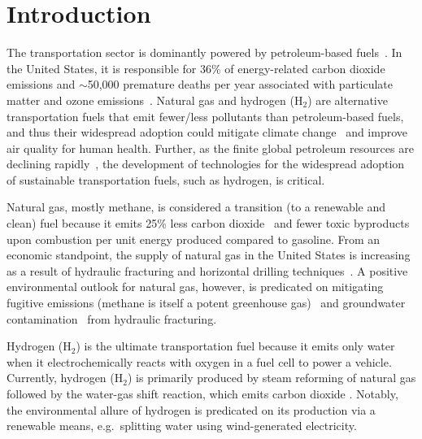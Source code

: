 \section{Introduction}
The transportation sector is dominantly powered by petroleum-based
fuels~\cite{davis2009transportation}. In the United States, it is responsible
for 36\% of energy-related carbon dioxide emissions \cite{useia} and $\sim$50,000
premature deaths per year associated with particulate matter and ozone
emissions~\cite{caiazzo2013air}. Natural gas and hydrogen (H$_2$) are
alternative transportation fuels that emit fewer/less pollutants than
petroleum-based fuels, and thus their widespread adoption could mitigate
climate change~\cite{mcglade2015geographical} and improve air quality for human
health. Further, as the finite global petroleum resources are declining
rapidly~\cite{sorrell2010global}, the development of technologies for the
widespread adoption of sustainable transportation fuels, such as hydrogen, is
critical.

Natural gas, mostly methane, is considered a transition (to a renewable and
clean) fuel because it emits 25\% less carbon dioxide~\cite{eia2013much} and
fewer toxic byproducts~\cite{wang2000full} upon combustion per unit energy
produced compared to gasoline. From an economic standpoint, the supply of
natural gas in the United States is increasing as a result of hydraulic
fracturing and horizontal drilling techniques~\cite{usnatgassupply}. A positive
environmental outlook for natural gas, however, is predicated on mitigating
fugitive emissions (methane is itself a potent greenhouse
gas)~\cite{alvarez2012greater} and groundwater
contamination~\cite{osborn2011methane} from hydraulic fracturing.

Hydrogen (H$_2$) is the ultimate transportation fuel because it emits only
water when it electrochemically reacts with oxygen in a fuel cell to power a
vehicle. Currently, hydrogen (H$_2$) is primarily produced by steam reforming
of natural gas followed by the water-gas shift reaction, which emits carbon
dioxide \cite{crabtree2004hydrogen}. Notably, the environmental allure of
hydrogen is predicated on its production via a renewable means, e.g.\ splitting
water using wind-generated electricity.


